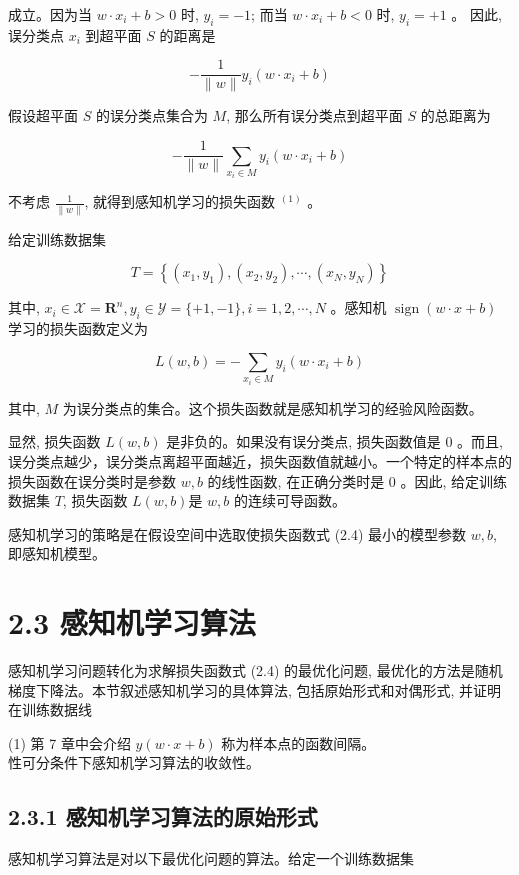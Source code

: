 \documentclass[10pt]{article}
\begin{document}
成立。因为当 $w \cdot x_{i}+b>0$ 时, $y_{i}=-1$; 而当 $w \cdot x_{i}+b<0$ 时, $y_{i}=+1$ 。 因此, 误分类点 $x_{i}$ 到超平面 $S$ 的距离是

$$
-\frac{1}{\|w\|} y_{i}\left(w \cdot x_{i}+b\right)
$$

假设超平面 $S$ 的误分类点集合为 $M$, 那么所有误分类点到超平面 $S$ 的总距离为

$$
-\frac{1}{\|w\|} \sum_{x_{i} \in M} y_{i}\left(w \cdot x_{i}+b\right)
$$

不考虑 $\frac{1}{\|w\|}$, 就得到感知机学习的损失函数 ${ }^{(1)}$ 。

给定训练数据集

$$
T=\left\{\left(x_{1}, y_{1}\right),\left(x_{2}, y_{2}\right), \cdots,\left(x_{N}, y_{N}\right)\right\}
$$

其中, $x_{i} \in \mathcal{X}=\boldsymbol{R}^{n}, y_{i} \in \mathcal{Y}=\{+1,-1\}, i=1,2, \cdots, N$ 。感知机 $\operatorname{sign}(w \cdot x+b)$ 学习的损失函数定义为


\begin{equation*}
L(w, b)=-\sum_{x_{i} \in M} y_{i}\left(w \cdot x_{i}+b\right) \tag{2.4}
\end{equation*}


其中, $M$ 为误分类点的集合。这个损失函数就是感知机学习的经验风险函数。

显然, 损失函数 $L(w, b)$ 是非负的。如果没有误分类点, 损失函数值是 0 。而且, 误分类点越少，误分类点离超平面越近，损失函数值就越小。一个特定的样本点的损失函数在误分类时是参数 $w, b$ 的线性函数, 在正确分类时是 0 。因此, 给定训练数据集 $T$, 损失函数 $L(w, b)$是 $w, b$ 的连续可导函数。

感知机学习的策略是在假设空间中选取使损失函数式 (2.4) 最小的模型参数 $w, b$, 即感知机模型。

\section*{2.3 感知机学习算法}
感知机学习问题转化为求解损失函数式 (2.4) 的最优化问题, 最优化的方法是随机梯度下降法。本节叙述感知机学习的具体算法, 包括原始形式和对偶形式, 并证明在训练数据线

(1) 第 7 章中会介绍 $y(w \cdot x+b)$ 称为样本点的函数间隔。\\
性可分条件下感知机学习算法的收敛性。

\subsection*{2.3.1 感知机学习算法的原始形式}
感知机学习算法是对以下最优化问题的算法。给定一个训练数据集
\end{document}
